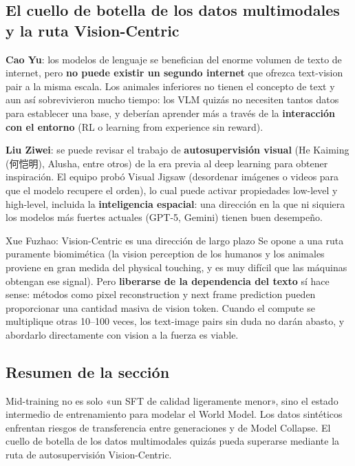 \documentclass[a4paper]{article}
\begin{document}
\subsection{El cuello de botella de los datos multimodales y la ruta Vision-Centric}

\textbf{Cao Yu}: los modelos de lenguaje se benefician del enorme volumen de texto de internet, pero \textbf{no puede existir un segundo internet} que ofrezca text-vision pair a la misma escala. Los animales inferiores no tienen el concepto de text y aun así sobrevivieron mucho tiempo: los VLM quizás no necesiten tantos datos para establecer una base, y deberían aprender más a través de la \textbf{interacción con el entorno} (RL o learning from experience sin reward).

\textbf{Liu Ziwei}: se puede revisar el trabajo de \textbf{autosupervisión visual} (He Kaiming (何恺明), Alusha, entre otros) de la era previa al deep learning para obtener inspiración. El equipo probó Visual Jigsaw (desordenar imágenes o videos para que el modelo recupere el orden), lo cual puede activar propiedades low-level y high-level, incluida la \textbf{inteligencia espacial}: una dirección en la que ni siquiera los modelos más fuertes actuales (GPT-5, Gemini) tienen buen desempeño.

\begin{importantbox}{Xue Fuzhao: Vision-Centric es una dirección de largo plazo}
Se opone a una ruta puramente biomimética (la vision perception de los humanos y los animales proviene en gran medida del physical touching, y es muy difícil que las máquinas obtengan ese signal). Pero \textbf{liberarse de la dependencia del texto} sí hace sense: métodos como pixel reconstruction y next frame prediction pueden proporcionar una cantidad masiva de vision token. Cuando el compute se multiplique otras 10--100 veces, los text-image pairs sin duda no darán abasto, y abordarlo directamente con vision a la fuerza es viable.
\end{importantbox}

\subsection{Resumen de la sección}
Mid-training no es solo «un SFT de calidad ligeramente menor», sino el estado intermedio de entrenamiento para modelar el World Model. Los datos sintéticos enfrentan riesgos de transferencia entre generaciones y de Model Collapse. El cuello de botella de los datos multimodales quizás pueda superarse mediante la ruta de autosupervisión Vision-Centric.
\end{document}
